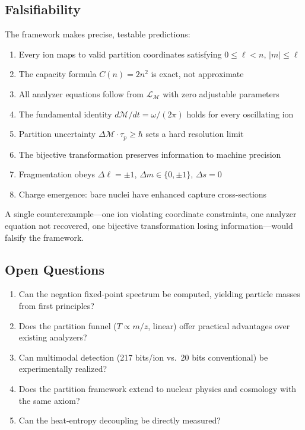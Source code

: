 \documentclass[twocolumn,10pt,a4paper]{article}
\theoremstyle{definition}
\theoremstyle{remark}
\newcommand{\Depth}{\mathcal{M}}
\newcommand{\Lagr}{\mathcal{L}}
\newcommand{\taup}{\tau_p}
\begin{document}
\subsection{Falsifiability}

The framework makes precise, testable predictions:
\begin{enumerate}
    \item Every ion maps to valid partition coordinates satisfying $0 \leq \ell < n$, $|m| \leq \ell$
    \item The capacity formula $C(n) = 2n^2$ is exact, not approximate
    \item All analyzer equations follow from $\Lagr_{\Depth}$ with zero adjustable parameters
    \item The fundamental identity $d\Depth/dt = \omega/(2\pi)$ holds for every oscillating ion
    \item Partition uncertainty $\Delta\Depth \cdot \taup \geq \hbar$ sets a hard resolution limit
    \item The bijective transformation preserves information to machine precision
    \item Fragmentation obeys $\Delta\ell = \pm 1$, $\Delta m \in \{0, \pm 1\}$, $\Delta s = 0$
    \item Charge emergence: bare nuclei have enhanced capture cross-sections
\end{enumerate}

A single counterexample---one ion violating coordinate constraints, one analyzer equation not recovered, one bijective transformation losing information---would falsify the framework.

\subsection{Open Questions}

\begin{enumerate}
    \item Can the negation fixed-point spectrum be computed, yielding particle masses from first principles?
    \item Does the partition funnel ($T \propto m/z$, linear) offer practical advantages over existing analyzers?
    \item Can multimodal detection (217 bits/ion vs.\ 20 bits conventional) be experimentally realized?
    \item Does the partition framework extend to nuclear physics and cosmology with the same axiom?
    \item Can the heat-entropy decoupling be directly measured?
\end{enumerate}
\end{document}
